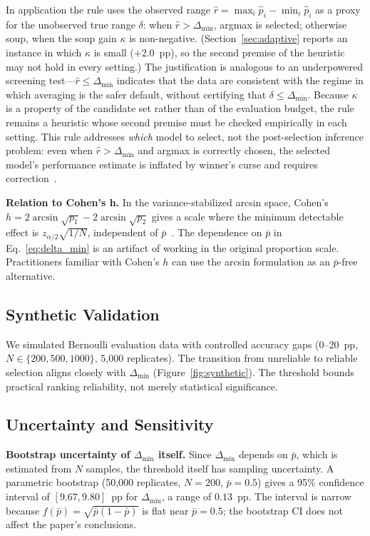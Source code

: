 \documentclass[pdflatex,sn-mathphys-ay,oneside]{sn-jnl}
\theoremstyle{thmstylethree}
\begin{document}
In application the rule uses the observed range $\hat r = \max_i \hat p_i - \min_i \hat p_i$ as a proxy for the unobserved true range $\delta$: when $\hat r > \Delta_{\min}$, argmax is selected; otherwise soup, when the soup gain $\kappa$ is non-negative. (Section~\ref{sec:adaptive} reports an instance in which $\kappa$ is small ($+2.0$~pp), so the second premise of the heuristic may not hold in every setting.) The justification is analogous to an underpowered screening test---$\hat r \leq \Delta_{\min}$ indicates that the data are consistent with the regime in which averaging is the safer default, without certifying that $\delta \leq \Delta_{\min}$. Because $\kappa$ is a property of the candidate set rather than of the evaluation budget, the rule remains a heuristic whose second premise must be checked empirically in each setting. This rule addresses \emph{which} model to select, not the post-selection inference problem: even when $\hat r > \Delta_{\min}$ and argmax is correctly chosen, the selected model's performance estimate is inflated by winner's curse and requires correction~\citep{zrnic2024flexible,zhang2024winners}.

\textbf{Relation to Cohen's h.} In the variance-stabilized arcsin space, Cohen's $h = 2\arcsin\sqrt{p_1} - 2\arcsin\sqrt{p_2}$ gives a scale where the minimum detectable effect is $z_{\alpha/2}\sqrt{1/N}$, independent of $\bar{p}$~\citep{cohen1988statistical}. The dependence on $\bar{p}$ in Eq.~\eqref{eq:delta_min} is an artifact of working in the original proportion scale. Practitioners familiar with Cohen's $h$ can use the arcsin formulation as an $\bar{p}$-free alternative.

\subsection{Synthetic Validation}

We simulated Bernoulli evaluation data with controlled accuracy gaps (0--20~pp, $N\in\{200,500,1000\}$, 5,000 replicates). The transition from unreliable to reliable selection aligns closely with $\Delta_{\min}$ (Figure~\ref{fig:synthetic}). The threshold bounds practical ranking reliability, not merely statistical significance.

\subsection{Uncertainty and Sensitivity}

\noindent\textbf{Bootstrap uncertainty of $\Delta_{\min}$ itself.} Since $\Delta_{\min}$ depends on $\bar{p}$, which is estimated from $N$ samples, the threshold itself has sampling uncertainty. A parametric bootstrap (50,000 replicates, $N=200$, $\bar{p}=0.5$) gives a 95\% confidence interval of $[9.67, 9.80]$~pp for $\Delta_{\min}$, a range of $0.13$~pp. The interval is narrow because $f(\bar{p})=\sqrt{\bar{p}(1-\bar{p})}$ is flat near $\bar{p}=0.5$; the bootstrap CI does not affect the paper's conclusions.
\end{document}
